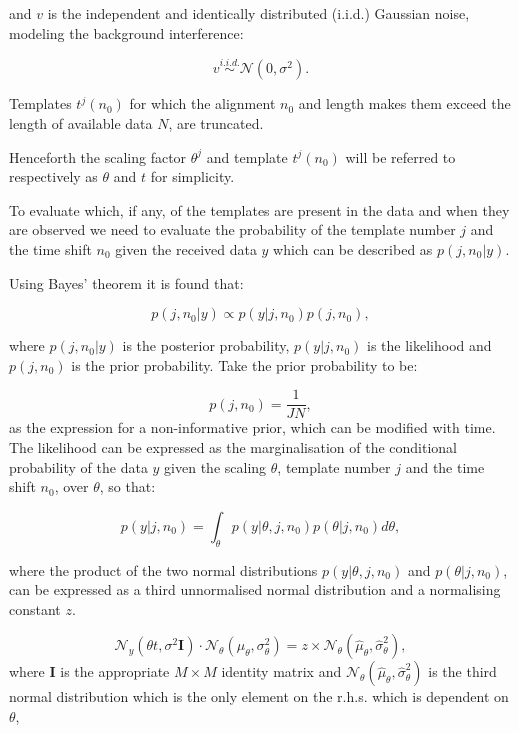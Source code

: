 and $v$ is the independent and identically distributed (i.i.d.) Gaussian noise, modeling the background interference:

\begin{equation}\label{eq:MLnoise}
v \stackrel{i.i.d.}{\sim} \mathcal{N}(0,\sigma^2).
\end{equation}

Templates $t^j(n_0)$ for which the alignment $n_0$ and length makes them exceed the length of available data $N$, are truncated.

Henceforth the scaling factor $\theta^j$ and template $t^j(n_0)$ will be referred to respectively as $\theta$ and $t$ for simplicity.

To evaluate which, if any, of the templates are present in the data and when they are observed we need to evaluate the probability of the template number $j$ and the time shift $n_0$ given the received data $y$ which can be described as $p(j,n_0|y)$.

Using Bayes' theorem it is found that:

\begin{equation}\label{eq:MLBayes}
p(j,n_0|y) \propto p(y|j,n_0)p(j,n_0),
\end{equation}

where $p(j,n_0|y)$ is the posterior probability, $p(y|j,n_0)$ is the likelihood and $p(j,n_0)$ is the prior probability.
Take the prior probability to be:

\begin{equation}\label{eq:MLPrior}
p(j,n_0) = \frac{1}{JN},
\end{equation}
as the expression for a non-informative prior, which can be modified with time.
The likelihood can be expressed as the marginalisation of the conditional probability of the data $y$ given the scaling $\theta$, template number $j$ and the time shift $n_0$, over $\theta$, so that:

\begin{equation}\label{eq:MLmargin}
p(y|j,n_0)=\int_\theta p(y|\theta, j, n_0) p(\theta|j,n_0) d\theta,
\end{equation}

where the product of the two normal distributions $p(y|\theta, j, n_0)$ and $p(\theta|j,n_0)$, can be expressed as a third unnormalised normal distribution and a normalising constant $z$.

\begin{equation}\label{eq:MLprod1}
\mathcal{N}_y(\theta t,\sigma^2 \textbf{I})\cdot\mathcal{N}_\theta(\mu_\theta,\sigma^2_\theta) = z \times \mathcal{N}_\theta(\hat{\mu}_\theta,\hat{\sigma}^2_\theta),
\end{equation}
where $\textbf{I}$ is the appropriate $M \times M$ identity matrix and $\mathcal{N}_\theta(\hat{\mu}_\theta,\hat{\sigma}_\theta^2)$ is the third normal distribution which is the only element on the r.h.s. which is dependent on $\theta$,

